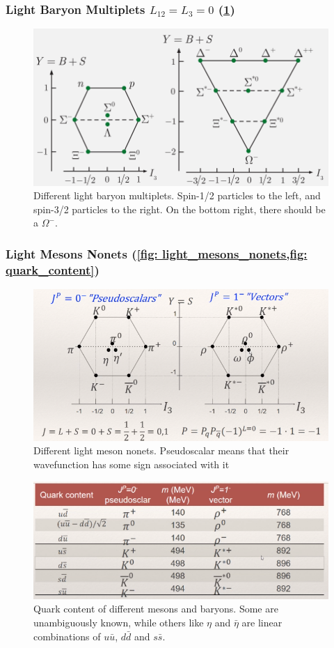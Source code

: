 \subsubsection{Light Baryon Multiplets $L_{12} = L_3 = 0$ (\cref{fig: light_baryon_multiplets})}
\begin{figure}[h!]
\centering
\includegraphics[width = .75\textwidth]{light_baryon_multiplets.png}
\caption{Different light baryon multiplets. Spin-1/2 particles to the left, and spin-3/2 particles to the right. On the bottom right, there should be a $Ω^{-}$.}
\label{fig: light_baryon_multiplets}
\end{figure}

\subsubsection{Light Mesons Nonets (\cref{fig: light_mesons_nonets,fig: quark_content})}





\begin{figure}[hb!]
\centering
\includegraphics[width = .75\textwidth]{light_mesons_nonets.png}
\caption{Different light meson nonets. Pseudoscalar means that their wavefunction has some sign associated with it}
\label{fig: light_mesons_nonets}
\end{figure}

\begin{figure}[hb!]
\centering
\includegraphics[width = .75\textwidth]{quark_content.png}
\caption{Quark content of different mesons and baryons. Some are unambiguously known, while others like $η$ and $\bar{η}$ are linear combinations of $u \bar{u}$, $d \bar{d}$ and $s \bar{s}$.}
\label{fig: quark_content}
\end{figure}



